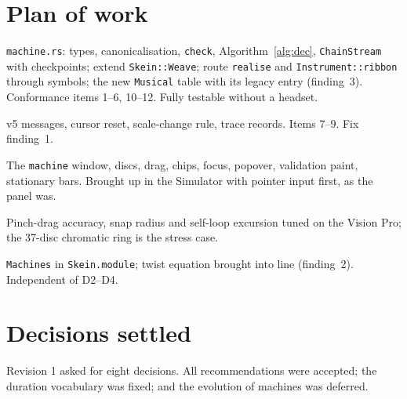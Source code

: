 \documentclass[11pt,a4paper]{article}
\theoremstyle{definition}
\theoremstyle{plain}
\theoremstyle{remark}
\begin{document}
\section{Plan of work}

\begin{description}[leftmargin=1cm,style=nextline,itemsep=3pt]
\item[\textbf{D1 --- Core.}] \texttt{machine.rs}: types, canonicalisation, \texttt{check},
  Algorithm~\ref{alg:dec}, \texttt{ChainStream} with checkpoints; extend \texttt{Skein::Weave};
  route \texttt{realise} and \texttt{Instrument::ribbon} through symbols; the new \texttt{Musical}
  table with its legacy entry (finding~3). Conformance items 1--6, 10--12. Fully testable without a
  headset.
\item[\textbf{D2 --- Engine and protocol.}] v5 messages, cursor reset, scale-change rule, trace
  records. Items 7--9. Fix finding~1.
\item[\textbf{D3 --- Editor.}] The \texttt{machine} window, discs, drag, chips, focus, popover,
  validation paint, stationary bars. Brought up in the Simulator with pointer input first, as the
  panel was.
\item[\textbf{D4 --- On device.}] Pinch-drag accuracy, snap radius and self-loop excursion tuned on
  the Vision Pro; the 37-disc chromatic ring is the stress case.
\item[\textbf{D5 --- Theory.}] \texttt{Machines} in \texttt{Skein.module}; twist equation brought
  into line (finding~2). Independent of D2--D4.
\end{description}

\section{Decisions settled}
\label{sec:decisions}

Revision 1 asked for eight decisions. All recommendations were accepted; the duration vocabulary was
fixed; and the evolution of machines was deferred.
\end{document}
